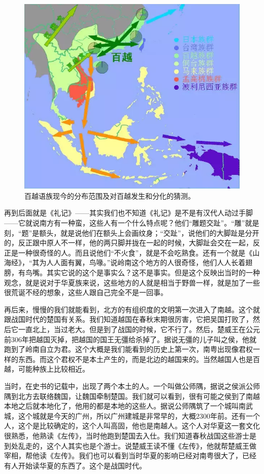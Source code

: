 \begin{figure}
	\centering
	\includegraphics[width=\textwidth]{images/image-5}
	\caption{百越语族现今的分布范围及对百越发生和分化的猜测。}
\end{figure}

再到后面就是《礼记》——其实我们也不知道《礼记》是不是有汉代人动过手脚——它就说南方有一种蛮，这些人有一个什么特点呢？他们“雕题交趾”。“雕”就是刻，“题”是额头，就是说他们在额头上会画纹身；“交趾”，说他们的大脚趾是分开的，反正跟中原人不一样，他的两只脚并拢在一起的时候，大脚趾会交在一起，反正是一种很奇怪的人。而且说他们“不火食”，就是不会吃熟食。还有一个就是《山海经》，“其为人人面有翼，鸟喙。”说岭南这个地方的人很奇怪，他们人人长着翅膀，有鸟嘴。其实它说的这个是事实么？这不是事实。但是这个反映出当时的一种观念，就是说对于华夏族来说，这些地方的人就是相当于野兽一样，就是加了一些很荒诞不经的想象，这些人跟自己完全不是一回事。

再后来，慢慢的我们就能看到，北方的有组织度的文明第一次进入了南越。这个就跟战国时代的楚国有关系。我们知道越国在春秋末期很厉害，它把吴国打败了，然后它一直北上，当过老大。但是到了战国的时候，它不行了。然后，楚威王在公元前306年把越国灭掉，把越国的国王无彊给杀掉了。据说无彊的儿子叫之侯，他就跑到了岭南自立为君。这个大概是我们能看到的历史上第一次，南粤出现像君权一样的东西。而这个君权不是本土产生的，而是北边的越国来的。当然越国人也是百越，可能种族上比较相近。

当时，在史书的记载中，出现了两个本土的人。一个叫做公师隅，据说之侯派公师隅到北方去联络魏国，让魏国牵制楚国。我们就可以看到，很有可能之侯到了南越本地之后就本地化了，他用的都是本地的这些人。据说公师隅筑了一个城叫南武城，这个城就是今天的广州，所以广州建城是非常早的，大概2300年前。还有一个人，这个是比较确定的，这个人叫高固，他也是南越人。这个人对华夏这一套文化很熟悉，他熟读《左传》，当时他跑到楚国去入仕。我们知道春秋战国这些游士是到处乱走的，这个人其实也是个游士。说楚威王读不懂《左传》，他就帮楚威王做宰相，帮他读《左传》。我们也可以看到当时华夏的影响已经对南粤很大了，已经有人开始读华夏的东西了。这个是战国时代。

